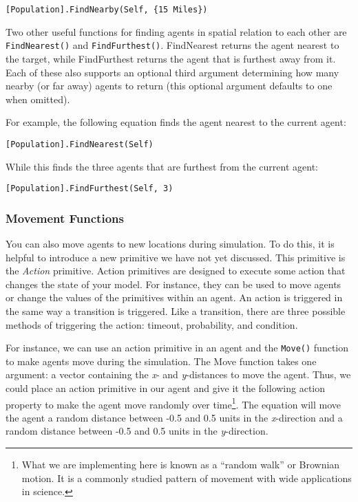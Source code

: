 \documentclass[]{memoir}
\begin{document}
\lstinline![Population].FindNearby(Self, {15 Miles})!

Two other useful functions for finding agents in spatial relation to
each other are \lstinline!FindNearest()! and \lstinline!FindFurthest()!.
FindNearest returns the agent nearest to the target, while FindFurthest
returns the agent that is furthest away from it. Each of these also
supports an optional third argument determining how many nearby (or far
away) agents to return (this optional argument defaults to one when
omitted).

For example, the following equation finds the agent nearest to the
current agent:

\lstinline![Population].FindNearest(Self)!

While this finds the three agents that are furthest from the current
agent:

\lstinline![Population].FindFurthest(Self, 3)!

\subsubsection{Movement Functions}

You can also move agents to new locations during simulation. To do this,
it is helpful to introduce a new primitive we have not yet discussed.
This primitive is the \emph{Action} primitive. Action primitives are
designed to execute some action that changes the state of your model.
For instance, they can be used to move agents or change the values of
the primitives within an agent. An action is triggered in the same way a
transition is triggered. Like a transition, there are three possible
methods of triggering the action: timeout, probability, and condition.

For instance, we can use an action primitive in an agent and the
\lstinline!Move()! function to make agents move during the simulation.
The Move function takes one argument: a vector containing the \emph{x}-
and \emph{y}-distances to move the agent. Thus, we could place an action
primitive in our agent and give it the following action property to make
the agent move randomly over time\footnote{What we are implementing here
  is known as a ``random walk'' or Brownian motion. It is a commonly
  studied pattern of movement with wide applications in science.}. The
equation will move the agent a random distance between -0.5 and 0.5
units in the \emph{x}-direction and a random distance between -0.5 and
0.5 units in the \emph{y}-direction.
\end{document}
